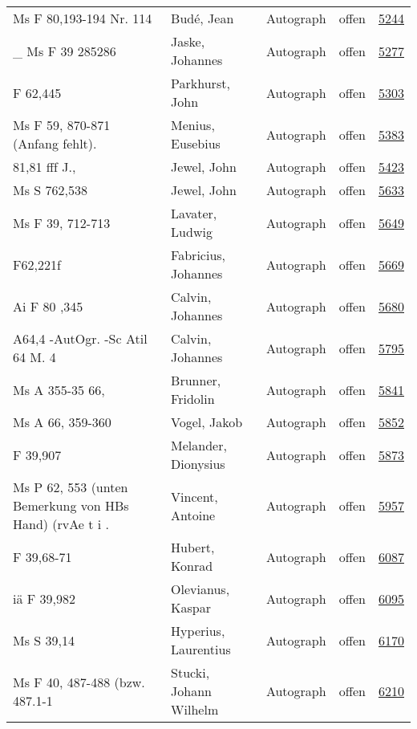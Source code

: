 \documentclass[10pt,a4paper,landscape]{report}
\begin{document}
\begin{longtable}{p{16cm}p{4cm}llr}
Ms F 80,193-194 Nr. 114	&	Budé, Jean	&	Autograph	&	offen	&	\href{http://130.60.24.72/assignment/5244}{5244}\\
\_ Ms F 39 285286	&	Jaske, Johannes	&	Autograph	&	offen	&	\href{http://130.60.24.72/assignment/5277}{5277}\\
F 62,445	&	Parkhurst, John	&	Autograph	&	offen	&	\href{http://130.60.24.72/assignment/5303}{5303}\\
Ms F 59, 870-871 (Anfang fehlt).	&	Menius, Eusebius	&	Autograph	&	offen	&	\href{http://130.60.24.72/assignment/5383}{5383}\\
81,81 fff J.,	&	Jewel, John	&	Autograph	&	offen	&	\href{http://130.60.24.72/assignment/5423}{5423}\\
Ms S 762,538	&	Jewel, John	&	Autograph	&	offen	&	\href{http://130.60.24.72/assignment/5633}{5633}\\
Ms F 39, 712-713	&	Lavater, Ludwig	&	Autograph	&	offen	&	\href{http://130.60.24.72/assignment/5649}{5649}\\
F62,221f	&	Fabricius, Johannes	&	Autograph	&	offen	&	\href{http://130.60.24.72/assignment/5669}{5669}\\
Ai F 80 ,345	&	Calvin, Johannes	&	Autograph	&	offen	&	\href{http://130.60.24.72/assignment/5680}{5680}\\
A64,4 -AutOgr. -Sc Atil 64 M. 4	&	Calvin, Johannes	&	Autograph	&	offen	&	\href{http://130.60.24.72/assignment/5795}{5795}\\
Ms A 355-35 66,	&	Brunner, Fridolin	&	Autograph	&	offen	&	\href{http://130.60.24.72/assignment/5841}{5841}\\
Ms A 66, 359-360	&	Vogel, Jakob	&	Autograph	&	offen	&	\href{http://130.60.24.72/assignment/5852}{5852}\\
F 39,907	&	Melander, Dionysius	&	Autograph	&	offen	&	\href{http://130.60.24.72/assignment/5873}{5873}\\
Ms P 62, 553 (unten Bemerkung von HBs Hand) (rvAe t i .	&	Vincent, Antoine	&	Autograph	&	offen	&	\href{http://130.60.24.72/assignment/5957}{5957}\\
F 39,68-71	&	Hubert, Konrad	&	Autograph	&	offen	&	\href{http://130.60.24.72/assignment/6087}{6087}\\
iä F 39,982	&	Olevianus, Kaspar	&	Autograph	&	offen	&	\href{http://130.60.24.72/assignment/6095}{6095}\\
Ms S 39,14	&	Hyperius, Laurentius	&	Autograph	&	offen	&	\href{http://130.60.24.72/assignment/6170}{6170}\\
Ms F 40, 487-488 (bzw. 487.1-1	&	Stucki, Johann Wilhelm	&	Autograph	&	offen	&	\href{http://130.60.24.72/assignment/6210}{6210}\\

\end{longtable}
\end{document}
